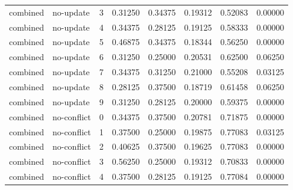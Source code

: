 \documentclass{article}
\begin{document}
\begin{center}
\begin{longtable}{llllllll}
combined & no-update & 3 & 0.31250 & 0.34375 & 0.19312 & 0.52083 & 0.00000 \\
combined & no-update & 4 & 0.34375 & 0.28125 & 0.19125 & 0.58333 & 0.00000 \\
combined & no-update & 5 & 0.46875 & 0.34375 & 0.18344 & 0.56250 & 0.00000 \\
combined & no-update & 6 & 0.31250 & 0.25000 & 0.20531 & 0.62500 & 0.06250 \\
combined & no-update & 7 & 0.34375 & 0.31250 & 0.21000 & 0.55208 & 0.03125 \\
combined & no-update & 8 & 0.28125 & 0.37500 & 0.18719 & 0.61458 & 0.06250 \\
combined & no-update & 9 & 0.31250 & 0.28125 & 0.20000 & 0.59375 & 0.00000 \\
combined & no-conflict & 0 & 0.34375 & 0.37500 & 0.20781 & 0.71875 & 0.00000 \\
combined & no-conflict & 1 & 0.37500 & 0.25000 & 0.19875 & 0.77083 & 0.03125 \\
combined & no-conflict & 2 & 0.40625 & 0.37500 & 0.19625 & 0.77083 & 0.00000 \\
combined & no-conflict & 3 & 0.56250 & 0.25000 & 0.19312 & 0.70833 & 0.00000 \\
combined & no-conflict & 4 & 0.37500 & 0.28125 & 0.19125 & 0.77084 & 0.00000 \\
\bottomrule
\end{longtable}
\renewcommand{\arraystretch}{1.0}
\end{center}
\end{document}
